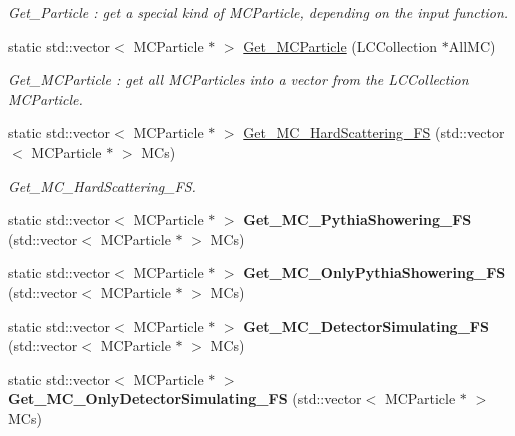 \begin{DoxyCompactItemize}
\begin{DoxyCompactList}\small\item\em Get\_\-Particle : get a special kind of MCParticle, depending on the input function. \item\end{DoxyCompactList}\item 
static std::vector$<$ MCParticle $\ast$ $>$ \hyperlink{classToolSet_1_1CMC_aec3000cf58c5ef65b62938decced8303}{Get\_\-MCParticle} (LCCollection $\ast$AllMC)
\begin{DoxyCompactList}\small\item\em Get\_\-MCParticle : get all MCParticles into a vector from the LCCollection MCParticle. \item\end{DoxyCompactList}\item 
static std::vector$<$ MCParticle $\ast$ $>$ \hyperlink{classToolSet_1_1CMC_a899d324f086d12abb75db9d87798ed91}{Get\_\-MC\_\-HardScattering\_\-FS} (std::vector$<$ MCParticle $\ast$ $>$ MCs)
\begin{DoxyCompactList}\small\item\em Get\_\-MC\_\-HardScattering\_\-FS. \item\end{DoxyCompactList}\item 
\hypertarget{classToolSet_1_1CMC_a321f55fa02ad6ed18931bc906b2e19ee}{
static std::vector$<$ MCParticle $\ast$ $>$ {\bfseries Get\_\-MC\_\-PythiaShowering\_\-FS} (std::vector$<$ MCParticle $\ast$ $>$ MCs)}
\label{classToolSet_1_1CMC_a321f55fa02ad6ed18931bc906b2e19ee}

\item 
\hypertarget{classToolSet_1_1CMC_aea4e69e23c45ca6ac4674ee90d56fc1c}{
static std::vector$<$ MCParticle $\ast$ $>$ {\bfseries Get\_\-MC\_\-OnlyPythiaShowering\_\-FS} (std::vector$<$ MCParticle $\ast$ $>$ MCs)}
\label{classToolSet_1_1CMC_aea4e69e23c45ca6ac4674ee90d56fc1c}

\item 
\hypertarget{classToolSet_1_1CMC_af0a81c6e40cc44cecfe9947be99783d4}{
static std::vector$<$ MCParticle $\ast$ $>$ {\bfseries Get\_\-MC\_\-DetectorSimulating\_\-FS} (std::vector$<$ MCParticle $\ast$ $>$ MCs)}
\label{classToolSet_1_1CMC_af0a81c6e40cc44cecfe9947be99783d4}

\item 
\hypertarget{classToolSet_1_1CMC_a766e7761a6db662243c7490a615c380e}{
static std::vector$<$ MCParticle $\ast$ $>$ {\bfseries Get\_\-MC\_\-OnlyDetectorSimulating\_\-FS} (std::vector$<$ MCParticle $\ast$ $>$ MCs)}
\label{classToolSet_1_1CMC_a766e7761a6db662243c7490a615c380e}


\end{DoxyCompactItemize}
